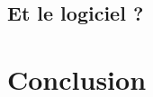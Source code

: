 \documentclass{beamer}
\begin{document}
\subsection{Et le logiciel ?}
\begin{frame}
	
\end{frame}

\section*{Conclusion}
\begin{frame}
	
\end{frame}

\begin{frame}
	
\end{frame}
\end{document}

